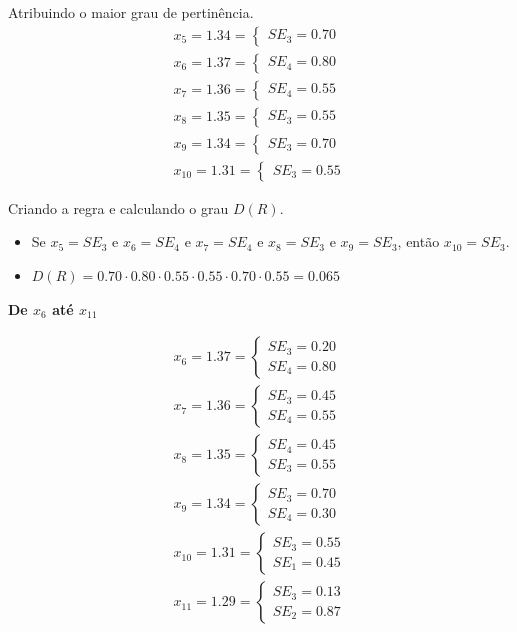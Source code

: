 \documentclass[12pt]{article}
\begin{document}
Atribuindo o maior grau de pertinência.
\begin{align*}
	x_5=1.34=\begin{cases}
		SE_3=0.70
	\end{cases}\\
	x_6=1.37=\begin{cases}
		SE_4=0.80
	\end{cases}\\
	x_7=1.36=\begin{cases}
		SE_4=0.55
	\end{cases}\\
	x_8=1.35=\begin{cases}
		SE_3=0.55
	\end{cases}\\
	x_9=1.34=\begin{cases}
		SE_3=0.70
	\end{cases}\\
	x_{10}=1.31=\begin{cases}
		SE_3=0.55
	\end{cases}
\end{align*}

Criando a regra e calculando o grau $D(R)$.
\begin{itemize}
	\item Se $x_5=SE_3$ e $x_6=SE_4$ e $x_7=SE_4$ e $x_8=SE_3$ e $x_9=SE_3$, então $x_{10}=SE_3$.
	\item $D(R)=0.70\cdot0.80\cdot0.55\cdot0.55\cdot0.70\cdot0.55=0.065$
\end{itemize}



\textbf{De $x_6$ até $x_{11}$}

\begin{align*}
	x_6=1.37=\begin{cases}
		SE_3=0.20\\SE_4=0.80
	\end{cases}\\
	x_7=1.36=\begin{cases}
		SE_3=0.45\\SE_4=0.55
	\end{cases}\\
	x_8=1.35=\begin{cases}
		SE_4=0.45\\SE_3=0.55
	\end{cases}\\
	x_9=1.34=\begin{cases}
		SE_3=0.70\\SE_4=0.30
	\end{cases}\\
	x_{10}=1.31=\begin{cases}
		SE_3=0.55\\SE_1=0.45
	\end{cases}\\
	x_{11}=1.29=\begin{cases}
		SE_3=0.13\\SE_2=0.87
	\end{cases}\\
\end{align*}
\end{document}
